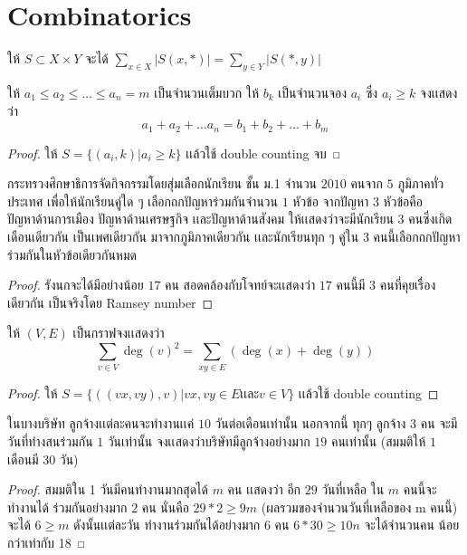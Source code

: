 \documentclass[a4paper,12pt]{scrartcl}
\begin{document}
\section{Combinatorics}
\begin{theorem} 
	ให้ $S \subset X \times Y$ จะได้
	$\sum_{x \in X} |S(x,*)| = \sum_{y \in Y} |S(*,y)|$ 
\end{theorem}
\begin{example}
	ให้ $a_1 \le a_2 \le \dots \le a_n = m$ เป็นจำนวนเต็มบวก ให้ $b_k$ เป็นจำนวนจอง $a_i$ ซึ่ง $a_i \ge k $ จงเเสดงว่า \[ a_1+a_2+\dots a_n = b_1+b_2+\dots +b_m \]
\end{example}
\begin{proof}
	ให้ $S = \{(a_i , k ) | a_i \ge k \}$ เเล้วใช้ double counting จบ
\end{proof}
\begin{example}
	กระทรวงศึกษาธิการจัดกิจกรรมโดยสุ่มเลือกนักเรียน ชั้น ม.1 จำนวน $2010$ คนจาก $5$ ภูมิภาคทั่ว\\ ประเทศ เพื่อให้นักเรียนคู่ใด ๆ เลือกถกปัญหาร่วมกันจำนวน $1$ หัวข้อ จากปัญหา $3$ หัวข้อคือ\\ ปัญหาด้านการเมือง ปัญหาด้านเศรษฐกิจ เเละปัญหาด้านสังคม ให้เเสดงว่าจะมีนักเรียน $3$ คนซึ่งเกิด\\เดือนเดียวกัน เป็นเพศเดียวกัน มาจากภูมิภาคเดียวกัน เเละนักเรียนทุก ๆ คู่ใน $3$ คนนี้เลือกถกปัญหา \\ ร่วมกันในหัวข้อเดียวกันหมด
\end{example}
\begin{proof}
	รังนกจะได้มีอย่างน้อย $17$ คน สอดคล้องกับโจทย์จะเเสดงว่า $17$ คนนี้มี $3$ คนที่คุยเรื่องเดียวกัน เป็นจริงโดย Ramsey number
\end{proof}
	\begin{example}
		ให้ $(V,E)$ เป็นกราฟจงเเสดงว่า \[
			\sum_{v\in V} \deg(v)^2 = \sum_{xy \in E}(\deg(x)+\deg(y))
		\]
	\end{example}
\begin{proof}
	ให้ $S = \{ ((vx,vy),v)| vx,vy \in E \text{เเละ} v \in V  \}$ เเล้วใช้ double counting
\end{proof}
	\begin{example}
		ในบางบริษัท ลูกจ้างเเต่ละคนจะทำงานเเค่ $10$ วันต่อเดือนเท่านั้น นอกจากนี้ ทุกๆ ลูกจ้าง $3$ คน จะมีวันที่ทำงสนร่วมกัน $1$ วันเท่านั้น จงเเสดงว่าบริษัทมีลูกจ้างอย่างมาก $19$ คนเท่านั้น (สมมติให้ $1$ เดือนมี $30$ วัน)
	\end{example}
\begin{proof}
	สมมติใน 1 วันมีคนทำงานมากสุดได้ $m$ คน เเสดงว่า อีก $29$ วันที่เหลือ ใน $m$ คนนี้จะทำงานได้ ร่วมกันอย่างมาก $2$ คน นั่นคือ $29*2 \ge 9m$ (ผลรวมของจำนวนวันที่เหลือของ m คนนี้) จะได้  $6 \ge m$ ดังนั้นเเต่ละวัน ทำงานร่วมกันได้อย่างมาก $6$ คน $6*30 \ge 10n$ จะได้จำนวนคน น้อยกว่าเท่ากับ 18
\end{proof}
\end{document}
